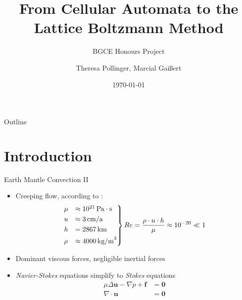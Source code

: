 \documentclass[aspectratio=43,t]{beamer}
\title{From Cellular Automata to the Lattice Boltzmann Method}
\subtitle{BGCE Honours Project}
\author[T. Pollinger, M. Gaißert]{Theresa Pollinger, Marcial Gaißert}
\institute[Ferienakademie 2017]{Ferienakademie Sarntal 2017}
\date{\today}
\begin{document}
\maketitle

  { %
    \begin{frame}[noframenumbering]{Outline}
      \tableofcontents
    \end{frame}
  }
  
\section{Introduction}

\begin{frame}{Earth Mantle Convection II}
\begin{itemize}
	\item Creeping flow, according to \cite{weismueller.2015}:
		\begin{align*}
		\begin{rcases}
		\mu &\approx10^{21}\,\text{Pa}\cdot \text{s}\\
		u &\approx3\,\text{cm/a}\\
		h &=2 867\,\text{km}\\
		\rho &\approx4000\,\text{kg/m}^3
		\end{rcases}
		Re =\frac{\rho \cdot u \cdot h}{\mu}\approx10^{-20} \ll 1
		\end{align*}
\pause
	\item Dominant viscous forces, negligible inertial forces
	\item \textit{Navier-Stokes} equations simplify to \textit{Stokes} equations
		\begin{align*}
		\mu\Delta \bm{u}-\nabla p + \bm{f} &= \bm{0}\\
		\nabla \cdot \bm{u} &= \bm{0}
		\end{align*}
\end{itemize}

\end{frame}
\end{document}
